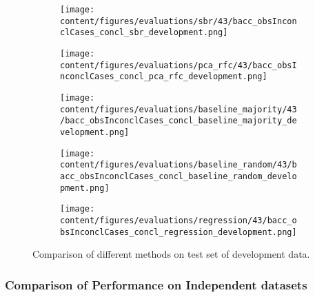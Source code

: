 \begin{figure}[t]
  \begin{subfigure}{0.5\textwidth}
    \centering
    \texttt{[image: content/figures/evaluations/sbr/43/bacc\_obsInconclCases\_concl\_sbr\_development.png]}
  \end{subfigure}
  \hfill
  \begin{subfigure}{0.5\textwidth}
    \centering
    \texttt{[image: content/figures/evaluations/pca\_rfc/43/bacc\_obsInconclCases\_concl\_pca\_rfc\_development.png]}
  \end{subfigure}
  \hfill
  \begin{subfigure}{0.5\textwidth}
    \centering
    \texttt{[image: content/figures/evaluations/baseline\_majority/43/bacc\_obsInconclCases\_concl\_baseline\_majority\_development.png]}
  \end{subfigure}
  \hfill
  \begin{subfigure}{0.5\textwidth}
    \centering
    \texttt{[image: content/figures/evaluations/baseline\_random/43/bacc\_obsInconclCases\_concl\_baseline\_random\_development.png]}
  \end{subfigure}
  \hfill
  \begin{subfigure}{0.5\textwidth}
    \centering
    \texttt{[image: content/figures/evaluations/regression/43/bacc\_obsInconclCases\_concl\_regression\_development.png]}
  \end{subfigure}

  \caption{Comparison of different methods on test set of development data.}
  \label{fig:test_dev}
\end{figure}



\subsubsection{Comparison of Performance on Independent datasets}
\label{subsubsec:perf_comp_indep}



